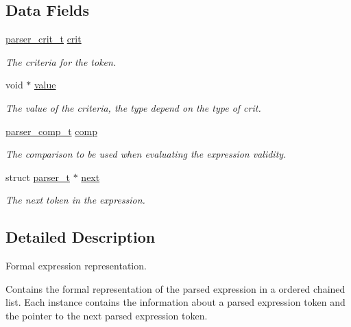 \subsection*{Data Fields}
\begin{DoxyCompactItemize}
\item 
\hyperlink{parser_8h_a4dcbe7148b91f50b0e7f3e08e780861d}{parser\+\_\+crit\+\_\+t} \hyperlink{structparser__t_af8e04406eee9097a92118be27b07eff7}{crit}
\begin{DoxyCompactList}\small\item\em The criteria for the token. \end{DoxyCompactList}\item 
void $\ast$ \hyperlink{structparser__t_a0f61d63b009d0880a89c843bd50d8d76}{value}
\begin{DoxyCompactList}\small\item\em The value of the criteria, the type depend on the type of \textquotesingle{}crit\textquotesingle{}. \end{DoxyCompactList}\item 
\hyperlink{parser_8h_ac721d0db2049edef01e62a2e63ff0472}{parser\+\_\+comp\+\_\+t} \hyperlink{structparser__t_a7bc05cec4ebb98215d11f1f354450f3d}{comp}
\begin{DoxyCompactList}\small\item\em The comparison to be used when evaluating the expression validity. \end{DoxyCompactList}\item 
struct \hyperlink{structparser__t}{parser\+\_\+t} $\ast$ \hyperlink{structparser__t_a044a5d882012dfdd9ea5e4f3a98fd8a2}{next}\hypertarget{structparser__t_a044a5d882012dfdd9ea5e4f3a98fd8a2}{}\label{structparser__t_a044a5d882012dfdd9ea5e4f3a98fd8a2}

\begin{DoxyCompactList}\small\item\em The next token in the expression. \end{DoxyCompactList}\end{DoxyCompactItemize}


\subsection{Detailed Description}
Formal expression representation. 

Contains the formal representation of the parsed expression in a ordered chained list. Each instance contains the information about a parsed expression token and the pointer to the {\ttfamily next} parsed expression token.

